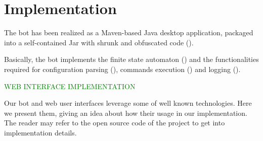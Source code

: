 \section{Implementation}
\label{sec:implementation}

The bot has been realized as a Maven-based Java desktop application, packaged into a self-contained Jar with shrunk and obfuscated code ().

Basically, the bot implements the finite state automaton () and the functionalities required for configuration parsing (), commands execution () and logging ().

\textcolor{green}{WEB INTERFACE IMPLEMENTATION \lipsum[1]}

Our bot and web user interfaces leverage some of well known technologies. Here we present them, giving an idea about how their usage in our implementation. The reader may refer to the open source code of the project to get into implementation details.


